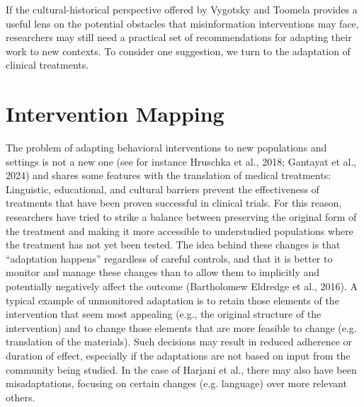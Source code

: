 \documentclass[authordate, empirical]{jote-new-article}
\begin{document}
	If the cultural-historical perspective offered by Vygotsky and Toomela provides a useful lens on the potential obstacles that misinformation interventions may face, researchers may still need a practical set of recommendations for adapting their work to new contexts. To consider one suggestion, we turn to the adaptation of clinical treatments.



	\section{Intervention Mapping}



	The problem of adapting behavioral interventions to new populations and settings is not a new one (see for instance Hruschka et al., 2018; Gantayat et al., 2024) and shares some features with the translation of medical treatments: Linguistic, educational, and cultural barriers prevent the effectiveness of treatments that have been proven successful in clinical trials. For this reason, researchers have tried to strike a balance between preserving the original form of the treatment and making it more accessible to understudied populations where the treatment has not yet been tested. The idea behind these changes is that “adaptation happens” regardless of careful controls, and that it is better to monitor and manage these changes than to allow them to implicitly and potentially negatively affect the outcome (Bartholomew Eldredge et al., 2016). A typical example of unmonitored adaptation is to retain those elements of the intervention that seem most appealing (e.g., the original structure of the intervention) and to change those elements that are more feasible to change (e.g. translation of the materials). Such decisions may result in reduced adherence or duration of effect, especially if the adaptations are not based on input from the community being studied. In the case of Harjani et al., there may also have been misadaptations, focusing on certain changes (e.g. language) over more relevant others.
\end{document}
